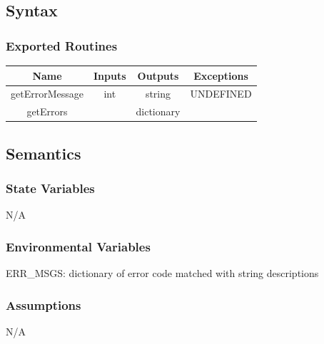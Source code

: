 \documentclass[11pt]{article}
\begin{document}
		\subsection{Syntax}
		\subsubsection{Exported Routines}
		\begin{tabular}[width=\textwidth, pos]{|c|c|c|c|}
			
			\hline
			\textbf{Name}& \textbf{Inputs} & \textbf{Outputs} & \textbf{Exceptions} \\ \hline
			getErrorMessage & int & string & UNDEFINED \\
			getErrors &  & dictionary & \\

			
			\hline
			
		\end{tabular}
		
		\subsection{Semantics}
		\subsubsection{State Variables}
		N/A
		
		\subsubsection{Environmental Variables}
		ERR\_MSGS: dictionary of error code matched with string descriptions
		
		\subsubsection{Assumptions}
		N/A
		
\end{document}
